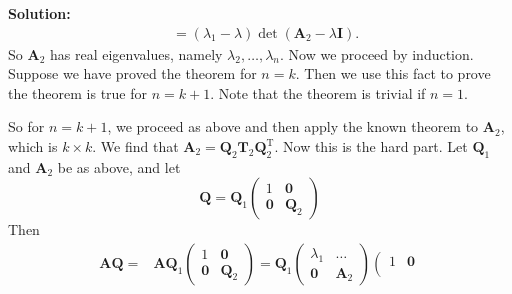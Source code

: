 \documentclass[14pt]{article}
\theoremstyle{definition}
\newenvironment{solution}
{\color{C2}\begin{framed}\begingroup\textbf{Solution:} }
  {\endgroup\end{framed}}
\theoremstyle{remark}
\begin{document}
\begin{solution}
$$\begin{aligned}
                                                                       & =\left(\lambda_1-\lambda\right) \operatorname{\det}\left(\boldsymbol{A}_2-\lambda \boldsymbol{I}\right) .
        \end{aligned}
    $$
    So $\boldsymbol{A}_2$ has real eigenvalues, namely $\lambda_2, \ldots, \lambda_n$. Now we proceed by induction. Suppose we have proved the theorem for $n=k$. Then we use this fact to prove the theorem is true for $n=k+1$. Note that the theorem is trivial if $n=1$.

    So for $n=k+1$, we proceed as above and then apply the known theorem to $\boldsymbol{A}_2$, which is $k \times k$. We find that $\boldsymbol{A}_2=\boldsymbol{Q}_2 \boldsymbol{T}_2 \boldsymbol{Q}_2^{\mathrm{T}}$. Now this is the hard part. Let $\boldsymbol{Q}_1$ and $\boldsymbol{A}_2$ be as above, and let
    $$
        \boldsymbol{Q}=\boldsymbol{Q}_1\left(\begin{array}{cc}
                1          & \mathbf{0}       \\
                \mathbf{0} & \boldsymbol{Q}_2
            \end{array}\right)
    $$
    Then
    $$
        \begin{aligned}
            \boldsymbol{A} \boldsymbol{Q}= & \boldsymbol{A} \boldsymbol{Q}_1\left(\begin{array}{cc}
                                                                                          1          & \mathbf{0}       \\
                                                                                          \mathbf{0} & \boldsymbol{Q}_2
                                                                                      \end{array}\right)=\boldsymbol{Q}_1\left(\begin{array}{cc}
                                                                                                                                   \lambda_1  & \ldots           \\
                                                                                                                                   \mathbf{0} & \boldsymbol{A}_2
                                                                                                                               \end{array}\right)\left(\begin{array}{cc}
                                                                                                                                                           1          & \mathbf{0}       \\

\end{array}
\end{aligned}$$
\end{solution}
\end{document}
